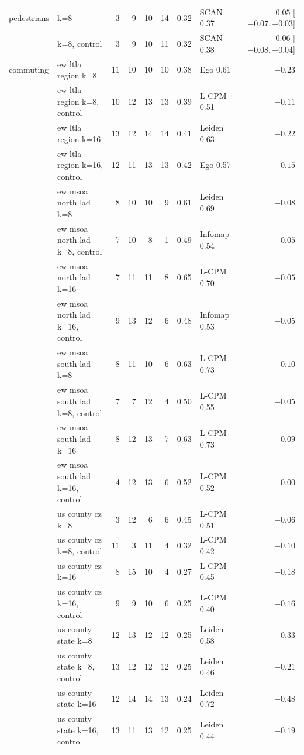 \begin{longtable*}{llrrrrrlr}
\hline
pedestrians & k=8 & 3 & 9 & 10 & 14 & 0.32 & SCAN 0.37 & $-0.05$ [$-0.07, -0.03$] \\
 & k=8, control & 3 & 9 & 10 & 11 & 0.32 & SCAN 0.38 & $-0.06$ [$-0.08, -0.04$] \\
\hline
commuting & ew ltla region k=8 & 11 & 10 & 10 & 10 & 0.38 & Ego 0.61 & $-0.23$ \\
 & ew ltla region k=8, control & 10 & 12 & 13 & 13 & 0.39 & L-CPM 0.51 & $-0.11$ \\
 & ew ltla region k=16 & 13 & 12 & 14 & 14 & 0.41 & Leiden 0.63 & $-0.22$ \\
 & ew ltla region k=16, control & 12 & 11 & 13 & 13 & 0.42 & Ego 0.57 & $-0.15$ \\
 & ew msoa north lad k=8 & 8 & 10 & 10 & 9 & 0.61 & Leiden 0.69 & $-0.08$ \\
 & ew msoa north lad k=8, control & 7 & 10 & 8 & 1 & 0.49 & Infomap 0.54 & $-0.05$ \\
 & ew msoa north lad k=16 & 7 & 11 & 11 & 8 & 0.65 & L-CPM 0.70 & $-0.05$ \\
 & ew msoa north lad k=16, control & 9 & 13 & 12 & 6 & 0.48 & Infomap 0.53 & $-0.05$ \\
 & ew msoa south lad k=8 & 8 & 11 & 10 & 6 & 0.63 & L-CPM 0.73 & $-0.10$ \\
 & ew msoa south lad k=8, control & 7 & 7 & 12 & 4 & 0.50 & L-CPM 0.55 & $-0.05$ \\
 & ew msoa south lad k=16 & 8 & 12 & 13 & 7 & 0.63 & L-CPM 0.73 & $-0.09$ \\
 & ew msoa south lad k=16, control & 4 & 12 & 13 & 6 & 0.52 & L-CPM 0.52 & $-0.00$ \\
 & us county cz k=8 & 3 & 12 & 6 & 6 & 0.45 & L-CPM 0.51 & $-0.06$ \\
 & us county cz k=8, control & 11 & 3 & 11 & 4 & 0.32 & L-CPM 0.42 & $-0.10$ \\
 & us county cz k=16 & 8 & 15 & 10 & 4 & 0.27 & L-CPM 0.45 & $-0.18$ \\
 & us county cz k=16, control & 9 & 9 & 10 & 6 & 0.25 & L-CPM 0.40 & $-0.16$ \\
 & us county state k=8 & 12 & 13 & 12 & 12 & 0.25 & Leiden 0.58 & $-0.33$ \\
 & us county state k=8, control & 13 & 12 & 12 & 12 & 0.25 & Leiden 0.46 & $-0.21$ \\
 & us county state k=16 & 12 & 14 & 14 & 13 & 0.24 & Leiden 0.72 & $-0.48$ \\
 & us county state k=16, control & 13 & 11 & 13 & 12 & 0.25 & Leiden 0.44 & $-0.19$ \\

\end{longtable*}
